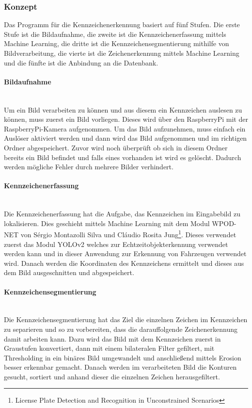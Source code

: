 \subsubsection{Konzept}
Das Programm für die Kennzeichenerkennung basiert auf fünf Stufen. Die erste Stufe ist die Bildaufnahme, die zweite ist die 
Kennzeichenerfassung mittels Machine Learning, die dritte ist die Kennzeichensegmentierung mithilfe von Bildverarbeitung, 
die vierte ist die Zeichenerkennung mittels Machine Learning und die fünfte ist die Anbindung an die Datenbank.

\paragraph{Bildaufnahme}\mbox{}\\
Um ein Bild verarbeiten zu können und aus diesem ein Kennzeichen auslesen zu können, muss zuerst ein Bild vorliegen. 
Dieses wird über den RaspberryPi mit der RaspberryPi-Kamera aufgenommen. Um das Bild aufzunehmen, muss einfach ein Auslöser 
aktiviert werden und dann wird das Bild aufgenommen und im richtigen Ordner abgespeichert. Zuvor wird noch überprüft ob 
sich in diesem Ordner bereits ein Bild befindet und falls eines vorhanden ist wird es gelöscht. Dadurch werden mögliche Fehler 
durch mehrere Bilder verhindert.

\paragraph{Kennzeichenerfassung}\mbox{}\\
Die Kennzeichenerfassung hat die Aufgabe, das Kennzeichen im Eingabebild zu lokalisieren. Dies geschieht mittels Machine Learning 
mit dem Modul WPOD-NET von Sérgio Montazolli Silva und Cláudio Rosita Jung\footnote{License Plate Detection and Recognition in Unconstrained Scenarios}. Dieses verwendet zuerst das Modul YOLOv2 welches zur 
Echtzeitobjekterkennung verwendet werden kann und in dieser Anwendung zur Erkennung von Fahrzeugen verwendet wird. Danach werden 
die Koordinaten des Kennzeichens ermittelt und dieses aus dem Bild ausgeschnitten und abgespeichert.

\paragraph{Kennzeichensegmentierung}\mbox{}\\
Die Kennzeichensegmentierung hat das Ziel die einzelnen Zeichen im Kennzeichen zu separieren und so zu vorbereiten, dass die 
darauffolgende Zeichenerkennung damit arbeiten kann. Dazu wird das Bild mit dem Kennzeichen zuerst in Graustufen konvertiert, 
dann mit einem bilateralen Filter gefiltert, mit Thresholding in ein binäres Bild umgewandelt und anschließend mittels Erosion 
besser erkennbar gemacht. Danach werden im verarbeiteten Bild die Konturen gesucht, sortiert und anhand dieser die einzelnen Zeichen herausgefiltert.

